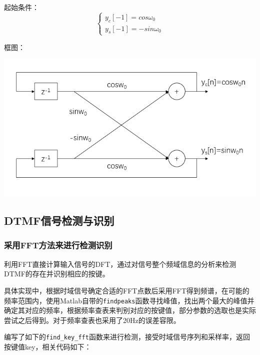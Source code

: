\documentclass[10pt, a4paper]{article}
\begin{document}
    起始条件：
    $$
    \left\{ 
    \begin{array}{c}
        y_c[-1]=cos\omega_0 \\ y_s[-1]=-sin\omega_0 
    \end{array}
    \right. 
    $$
    
    框图：
    
    \centerline{\includegraphics[scale=0.6]{assets/2.png}}

\subsection{DTMF信号检测与识别}

\subsubsection{采用FFT方法来进行检测识别}

    利用FFT直接计算输入信号的DFT，通过对信号整个频域信息的分析来检测DTMF的存在并识别相应的按键。
    
    具体实现中，根据时域信号确定合适的FFT点数后采用FFT得到频谱，在可能的频率范围内，使用Matlab自带的\texttt{findpeaks}函数寻找峰值，找出两个最大的峰值并确定其对应的频率，根据频率查表来判别对应的按键值，部分参数的选取也是实际尝试之后得到。对于频率查表也采用了20Hz的误差容限。
    
    编写了如下的\texttt{find\_key\_fft}函数来进行检测，接受时域信号序列和采样率，返回按键值key，相关代码如下：
\end{document}
